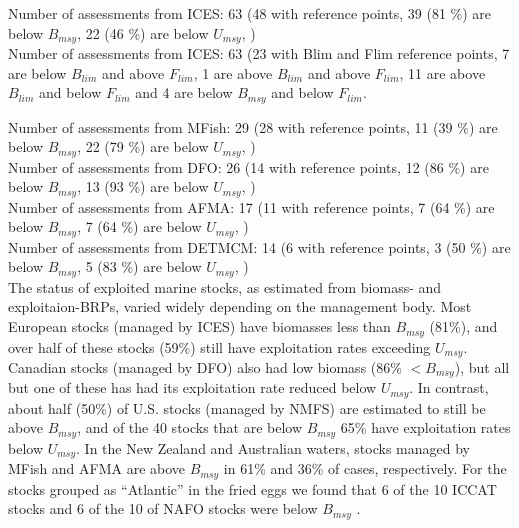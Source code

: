 Number of assessments from ICES: 63 (48 with reference points, 39 (81 \%) are below $B_{msy}$, 22 (46 \%) are below $U_{msy}$, ) \\

Number of assessments from ICES: 63 (23 with Blim and Flim reference points, 7 are below $B_{lim}$ and above $F_{lim}$, 1 are above $B_{lim}$ and above $F_{lim}$, 11 are above $B_{lim}$ and below $F_{lim}$ and 4 are below $B_{msy}$ and below $F_{lim}$.

Number of assessments from MFish: 29 (28 with reference points, 11 (39 \%) are below $B_{msy}$, 22 (79 \%) are below $U_{msy}$, ) \\
Number of assessments from DFO: 26 (14 with reference points, 12 (86 \%) are below $B_{msy}$, 13 (93 \%) are below $U_{msy}$, ) \\
Number of assessments from AFMA: 17 (11 with reference points, 7 (64 \%) are below $B_{msy}$, 7 (64 \%) are below $U_{msy}$, ) \\
Number of assessments from DETMCM: 14 (6 with reference points, 3 (50 \%) are below $B_{msy}$, 5 (83 \%) are below $U_{msy}$, ) \\

The status of exploited marine stocks, as estimated from biomass- and
exploitaion-BRPs, varied widely depending on the management body. Most European stocks (managed by
ICES) have biomasses less than $B_{msy}$
(81\%), and over half of these
stocks (59\%) still
have exploitation rates exceeding $U_{msy}$. Canadian stocks (managed
by DFO) also had low biomass (86\%
$< B_{msy}$), but all but one of these has had its exploitation rate
reduced below $U_{msy}$. In contrast, about half
(50\%) of U.S. stocks (managed by
NMFS) are estimated to still be above $B_{msy}$, and of the
40 stocks that are below $B_{msy}$
65\% have exploitation
rates below $U_{msy}$. In the New
Zealand and Australian waters, stocks managed by MFish and AFMA are
above $B_{msy}$ in 61\% and
36\% of cases, respectively. For
the stocks grouped as ``Atlantic'' in the fried eggs we
found that 6 of the
10 ICCAT stocks and
6 of the
10 of NAFO stocks were below $B_{msy}$ .



